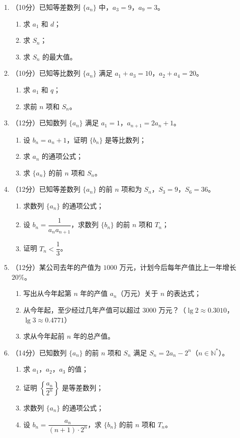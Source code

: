 \documentclass[12pt, a4paper]{ctexart}
\begin{document}
\begin{enumerate}[resume]
\item （10分）已知等差数列 $\{a_n\}$ 中，$a_3=9$，$a_9=3$。
\begin{enumerate}[label=(\arabic*)]
\item 求 $a_1$ 和 $d$；
\item 求 $S_n$；
\item 求 $S_n$ 的最大值。
\end{enumerate}

\item （10分）已知等比数列 $\{a_n\}$ 满足 $a_1+a_3=10$，$a_2+a_4=20$。
\begin{enumerate}[label=(\arabic*)]
\item 求 $a_1$ 和 $q$；
\item 求前 $n$ 项和 $S_n$。
\end{enumerate}

\item （12分）已知数列 $\{a_n\}$ 满足 $a_1=1$，$a_{n+1}=2a_n+1$。
\begin{enumerate}[label=(\arabic*)]
\item 设 $b_n=a_n+1$，证明 $\{b_n\}$ 是等比数列；
\item 求 $a_n$ 的通项公式；
\item 求 $\{a_n\}$ 的前 $n$ 项和 $S_n$。
\end{enumerate}

\item （12分）已知等差数列 $\{a_n\}$ 的前 $n$ 项和为 $S_n$，$S_3=9$，$S_6=36$。
\begin{enumerate}[label=(\arabic*)]
\item 求数列 $\{a_n\}$ 的通项公式；
\item 设 $b_n=\dfrac{1}{a_n a_{n+1}}$，求数列 $\{b_n\}$ 的前 $n$ 项和 $T_n$；
\item 证明 $T_n<\dfrac{1}{3}$。
\end{enumerate}

\item （12分）某公司去年的产值为 $1000$ 万元，计划今后每年产值比上一年增长 $20\%$。
\begin{enumerate}[label=(\arabic*)]
\item 写出从今年起第 $n$ 年的产值 $a_n$（万元）关于 $n$ 的表达式；
\item 从今年起，至少经过几年产值可以超过 $3000$ 万元？（$\lg 2\approx 0.3010$，$\lg 3\approx 0.4771$）
\item 求从今年起前 $n$ 年的总产值。
\end{enumerate}

\item （14分）已知数列 $\{a_n\}$ 的前 $n$ 项和 $S_n$ 满足 $S_n=2a_n-2^n$（$n\in\mathbb{N}^*$）。
\begin{enumerate}[label=(\arabic*)]
\item 求 $a_1$，$a_2$，$a_3$ 的值；
\item 证明 $\left\{\dfrac{a_n}{2^n}\right\}$ 是等差数列；
\item 求数列 $\{a_n\}$ 的通项公式；
\item 设 $b_n=\dfrac{a_n}{(n+1)\cdot 2^n}$，求 $\{b_n\}$ 的前 $n$ 项和 $T_n$。
\end{enumerate}
\end{enumerate}
\end{document}
